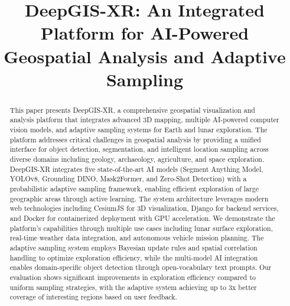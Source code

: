 \documentclass[conference]{IEEEtran}
\begin{document}
\title{DeepGIS-XR: An Integrated Platform for AI-Powered Geospatial Analysis and Adaptive Sampling}

\author{
\and
{}
\and
{}
}

\maketitle

\begin{abstract}
This paper presents DeepGIS-XR, a comprehensive geospatial visualization and analysis platform that integrates advanced 3D mapping, multiple AI-powered computer vision models, and adaptive sampling systems for Earth and lunar exploration. The platform addresses critical challenges in geospatial analysis by providing a unified interface for object detection, segmentation, and intelligent location sampling across diverse domains including geology, archaeology, agriculture, and space exploration. DeepGIS-XR integrates five state-of-the-art AI models (Segment Anything Model, YOLOv8, Grounding DINO, Mask2Former, and Zero-Shot Detection) with a probabilistic adaptive sampling framework, enabling efficient exploration of large geographic areas through active learning. The system architecture leverages modern web technologies including CesiumJS for 3D visualization, Django for backend services, and Docker for containerized deployment with GPU acceleration. We demonstrate the platform's capabilities through multiple use cases including lunar surface exploration, real-time weather data integration, and autonomous vehicle mission planning. The adaptive sampling system employs Bayesian update rules and spatial correlation handling to optimize exploration efficiency, while the multi-model AI integration enables domain-specific object detection through open-vocabulary text prompts. Our evaluation shows significant improvements in exploration efficiency compared to uniform sampling strategies, with the adaptive system achieving up to 3x better coverage of interesting regions based on user feedback.
\end{abstract}
\end{document}
